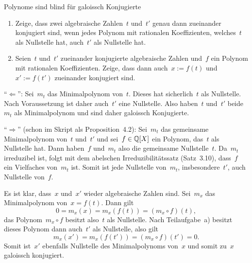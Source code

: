 \documentclass{algblatt}
\begin{document}
\begin{aufgabe}{Polynome sind blind für galoissch Konjugierte}
\begin{enumerate}
\item Zeige, dass zwei algebraische Zahlen~$t$ und~$t'$ genau dann zueinander
konjugiert sind,
wenn jedes Polynom mit
rationalen Koeffizienten, welches~$t$ als Nullstelle hat, auch~$t'$ als
Nullstelle hat.
\item Seien~$t$ und~$t'$ zueinander konjugierte algebraische Zahlen
und~$f$ ein Polynom mit rationalen Koeffizienten. Zeige, dass dann auch~$x := f(t)$ und~$x' := f(t')$ zueinander konjugiert sind.
\end{enumerate}

\begin{loesungE}
\item "`$\Longleftarrow$"': Sei~$m_t$ das Minimalpolynom von~$t$. Dieses hat
sicherlich~$t$ als Nullstelle. Nach Voraussetzung ist daher auch~$t'$ eine
Nullstelle. Also haben~$t$ und~$t'$ beide~$m_t$ als Minimalpolynom und sind
daher galoissch Konjugierte.

"`$\Longrightarrow$"' (schon im Skript als Proposition~4.2): Sei~$m_t$ das
gemeinsame Minimalpolynom von~$t$ und~$t'$
und sei~$f \in \mathbb{Q}[X]$ ein Polynom, das~$t$ als Nullstelle hat. Dann
haben~$f$ und~$m_t$ also die gemeinsame Nullstelle~$t$. Da~$m_t$ irreduzibel
ist, folgt mit dem abelschen Irreduzibilitätssatz (Satz~3.10), dass~$f$ ein
Vielfaches von~$m_t$ ist. Somit ist jede Nullstelle von~$m_t$,
insbesondere~$t'$, auch Nullstelle von~$f$.

\item Es ist klar, dass~$x$ und~$x'$ wieder algebraische Zahlen sind.
Sei~$m_x$ das Minimalpolynom von~$x = f(t)$. Dann gilt
\[ 0 = m_x(x) = m_x(f(t)) = (m_x \circ f)(t), \]
das Polynom~$m_x \circ f$ besitzt also~$t$ als Nullstelle. Nach
Teilaufgabe~a) besitzt dieses Polynom dann auch~$t'$ als Nullstelle, also gilt
\[ m_x(x') = m_x(f(t')) = (m_x \circ f)(t') = 0. \]
Somit ist~$x'$ ebenfalls Nullstelle des Minimalpolynoms von~$x$ und somit
zu~$x$ galoissch konjugiert.
\end{loesungE}
\end{aufgabe}
\end{document}
